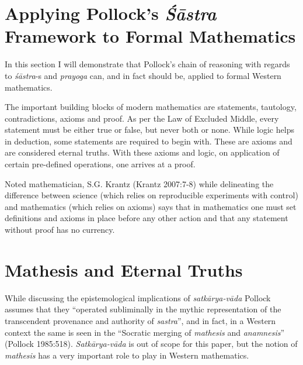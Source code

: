 \section*{Applying Pollock’s {\sl\bfseries Śāstra} Framework to Formal Mathematics}

In this section I will demonstrate that Pollock’s chain of reasoning with regards to {\sl śāstra}-s and {\sl prayoga} can, and in fact should be, applied to formal Western mathematics.

The important building blocks of modern mathematics are statements, tautology, contradictions, axioms and proof. As per the Law of Excluded Middle, every statement must be either true or false, but never both or none.  While logic helps in deduction, some statements are required to begin with. These are axioms and are considered eternal truths. With these axioms and logic, on application of certain pre-defined operations, one arrives at a proof. 

Noted mathematician, S.G. Krantz (Krantz 2007:7-8) while delineating the difference between science (which relies on reproducible experiments with control) and mathematics (which relies on axioms) says that in mathematics one must set definitions and axioms in place before any other action and that any statement without proof has no currency.	

\section*{Mathesis and Eternal Truths}

While discussing the epistemological implications of {\sl satkārya-vāda} Pollock assumes that they ``operated subliminally in the mythic representation of the transcendent provenance and authority of {\sl sastra}'', and in fact, in a Western context the same is seen in the ``Socratic merging of {\sl mathesis} and {\sl anamnesis}'' (Pollock 1985:518). {\sl Satkārya-vāda} is out of scope for this paper, but the notion of {\sl mathesis} has a very important role to play in Western mathematics. 

